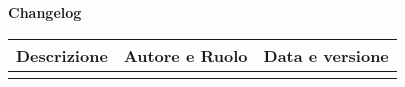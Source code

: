 \newpage
\begin{center}
	\Large{\textbf{Changelog}}
	\\\vspace{0.5cm}
	\normalsize
	\begin{tabularx}{\textwidth}{Xcc}
		\textbf{Descrizione} & \textbf{Autore e Ruolo} & \textbf{Data e versione} \\\toprule
		\modifiche
		\bottomrule
	\end{tabularx}
\end{center}
